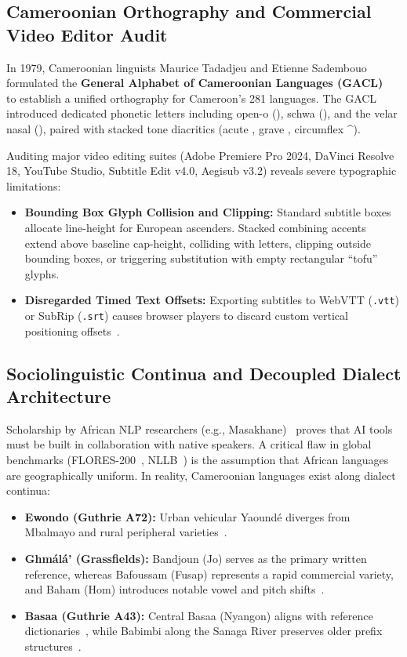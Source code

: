 \documentclass[conference]{IEEEtran}
\begin{document}
\subsection{Cameroonian Orthography and Commercial Video Editor Audit}
\label{sec:sota:gacl}

In 1979, Cameroonian linguists Maurice Tadadjeu and Etienne Sadembouo formulated the \textbf{General Alphabet of Cameroonian Languages (GACL)}~\cite{tadadjeu1979alphabet} to establish a unified orthography for Cameroon's 281 languages. The GACL introduced dedicated phonetic letters including open-o (\textopeno), schwa (\textschwa), and the velar nasal (\textipa{\ng}), paired with stacked tone diacritics (acute \textasciiacute{}, grave \textasciigrave{}, circumflex \^{}).

Auditing major video editing suites (Adobe Premiere Pro 2024, DaVinci Resolve 18, YouTube Studio, Subtitle Edit v4.0, Aegisub v3.2) reveals severe typographic limitations:
\begin{itemize}
    \item \textbf{Bounding Box Glyph Collision and Clipping:} Standard subtitle boxes allocate line-height for European ascenders. Stacked combining accents extend above baseline cap-height, colliding with letters, clipping outside bounding boxes, or triggering substitution with empty rectangular ``tofu'' glyphs.
    \item \textbf{Disregarded Timed Text Offsets:} Exporting subtitles to WebVTT (\texttt{.vtt}) or SubRip (\texttt{.srt}) causes browser players to discard custom vertical positioning offsets~\cite{w3c2019webvtt}.
\end{itemize}

\subsection{Sociolinguistic Continua and Decoupled Dialect Architecture}
\label{sec:sota:dialect}

Scholarship by African NLP researchers (e.g., Masakhane)~\cite{nekoto2020participatory} proves that AI tools must be built in collaboration with native speakers. A critical flaw in global benchmarks (FLORES-200~\cite{conneau2023fleurs}, NLLB~\cite{conneau2023fleurs}) is the assumption that African languages are geographically uniform. In reality, Cameroonian languages exist along dialect continua:
\begin{itemize}
    \item \textbf{Ewondo (Guthrie A72):} Urban vehicular Yaound\'e diverges from Mbalmayo and rural peripheral varieties~\cite{tadadjeu1979alphabet}.
    \item \textbf{Gh\textopeno m\'al\'a' (Grassfields):} Bandjoun (Jo) serves as the primary written reference, whereas Bafoussam (Fusap) represents a rapid commercial variety, and Baham (Hom) introduces notable vowel and pitch shifts~\cite{tadadjeu1979alphabet}.
    \item \textbf{Basaa (Guthrie A43):} Central Basaa (Nyangon) aligns with reference dictionaries~\cite{tadadjeu1979alphabet}, while Babimbi along the Sanaga River preserves older prefix structures~\cite{tadadjeu1979alphabet}.
\end{itemize}
\end{document}
